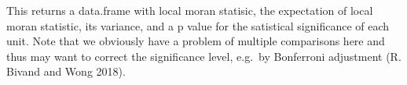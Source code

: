 \documentclass[
  letterpaper,
  DIV=11,
  numbers=noendperiod]{scrreprt}
\newenvironment{Shaded}{\begin{snugshade}}{\end{snugshade}}
\newcommand{\FunctionTok}[1]{\textcolor[rgb]{0.28,0.35,0.67}{#1}}
\newcommand{\NormalTok}[1]{\textcolor[rgb]{0.00,0.23,0.31}{#1}}
\newcommand{\OtherTok}[1]{\textcolor[rgb]{0.00,0.23,0.31}{#1}}
\newcommand{\SpecialCharTok}[1]{\textcolor[rgb]{0.37,0.37,0.37}{#1}}
\newcommand{\StringTok}[1]{\textcolor[rgb]{0.13,0.47,0.30}{#1}}
\begin{document}
This returns a data.frame with local moran statisic, the expectation of
local moran statistic, its variance, and a p value for the satistical
significance of each unit. Note that we obviously have a problem of
multiple comparisons here and thus may want to correct the significance
level, e.g.~by Bonferroni adjustment (R. Bivand and Wong 2018).

\begin{Shaded}
\end{Shaded}
\end{document}
